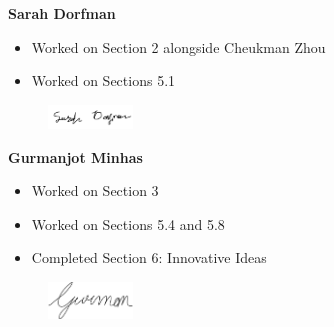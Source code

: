 \textbf{Sarah Dorfman}
\begin{itemize}
    \item Worked on Section 2 alongside Cheukman Zhou
    \item Worked on Sections 5.1
\end{itemize}
\begin{figure}[H]
	\centering
	\includegraphics[width=0.2\textwidth]{Signatures/s.png}
\end{figure}

\textbf{Gurmanjot Minhas}
\begin{itemize}
    \item Worked on Section 3
    \item Worked on Sections 5.4 and 5.8
    \item Completed Section 6: Innovative Ideas
\end{itemize}
\begin{figure}[H]
	\centering
	\includegraphics[width=0.2\textwidth]{Signatures/g.png}
\end{figure}

